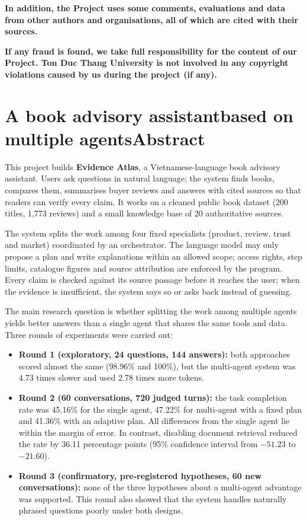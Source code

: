 \documentclass[12pt,a4paper,oneside]{report}
\begin{document}
\textbf{In addition, the Project uses some comments, evaluations and data from other authors and organisations, all of which are cited with their sources.}

\textbf{If any fraud is found, we take full responsibility for the content of our Project. Ton Duc Thang University is not involved in any copyright violations caused by us during the project (if any).}

\kyten

\chapter*{A book advisory assistant\xuongdong{}based on multiple agents\canhtieude{}Abstract}

This project builds \textbf{Evidence Atlas}, a Vietnamese-language book advisory assistant. Users ask questions in natural language; the system finds books, compares them, summarises buyer reviews and answers with cited sources so that readers can verify every claim. It works on a cleaned public book dataset (200 titles, 1,773 reviews) and a small knowledge base of 20 authoritative sources.

The system splits the work among four fixed specialists (product, review, trust and market) coordinated by an orchestrator. The language model may only propose a plan and write explanations within an allowed scope; access rights, step limits, catalogue figures and source attribution are enforced by the program. Every claim is checked against its source passage before it reaches the user; when the evidence is insufficient, the system says so or asks back instead of guessing.

The main research question is whether splitting the work among multiple agents yields better answers than a single agent that shares the same tools and data. Three rounds of experiments were carried out:

\begin{itemize}
    \item \textbf{Round 1 (exploratory, 24 questions, 144 answers):} both approaches scored almost the same (98.96\% and 100\%), but the multi-agent system was 4.73 times slower and used 2.78 times more tokens.
    \item \textbf{Round 2 (60 conversations, 720 judged turns):} the task completion rate was 45.16\% for the single agent, 47.22\% for multi-agent with a fixed plan and 41.36\% with an adaptive plan. All differences from the single agent lie within the margin of error. In contrast, disabling document retrieval reduced the rate by 36.11 percentage points (95\% confidence interval from $-51.23$ to $-21.60$).
    \item \textbf{Round 3 (confirmatory, pre-registered hypotheses, 60 new conversations):} none of the three hypotheses about a multi-agent advantage was supported. This round also showed that the system handles naturally phrased questions poorly under both designs.
\end{itemize}
\end{document}
